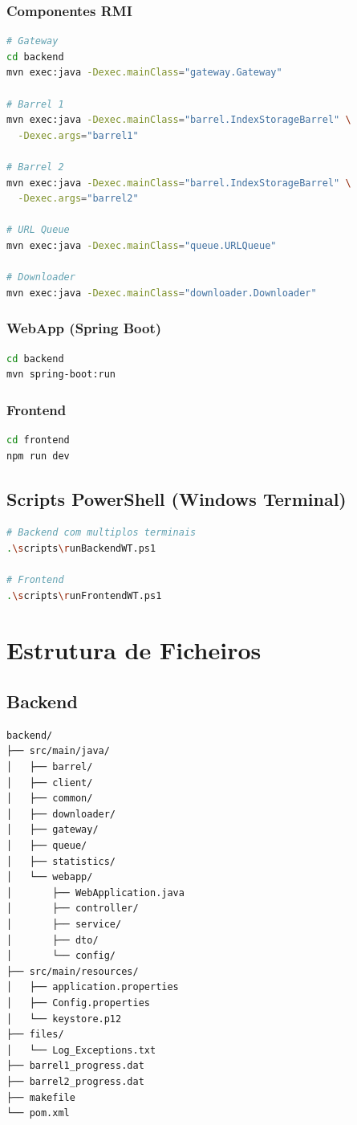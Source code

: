 \documentclass[12pt,a4paper]{article}
\begin{document}
\subsubsection{Componentes RMI}
\begin{lstlisting}[language=bash]
# Gateway
cd backend
mvn exec:java -Dexec.mainClass="gateway.Gateway"

# Barrel 1
mvn exec:java -Dexec.mainClass="barrel.IndexStorageBarrel" \
  -Dexec.args="barrel1"

# Barrel 2
mvn exec:java -Dexec.mainClass="barrel.IndexStorageBarrel" \
  -Dexec.args="barrel2"

# URL Queue
mvn exec:java -Dexec.mainClass="queue.URLQueue"

# Downloader
mvn exec:java -Dexec.mainClass="downloader.Downloader"
\end{lstlisting}

\subsubsection{WebApp (Spring Boot)}
\begin{lstlisting}[language=bash]
cd backend
mvn spring-boot:run
\end{lstlisting}

\subsubsection{Frontend}
\begin{lstlisting}[language=bash]
cd frontend
npm run dev
\end{lstlisting}

\subsection{Scripts PowerShell (Windows Terminal)}
\begin{lstlisting}[language=bash]
# Backend com multiplos terminais
.\scripts\runBackendWT.ps1

# Frontend
.\scripts\runFrontendWT.ps1
\end{lstlisting}

\section{Estrutura de Ficheiros}

\subsection{Backend}
\begin{lstlisting}
backend/
├── src/main/java/
│   ├── barrel/
│   ├── client/
│   ├── common/
│   ├── downloader/
│   ├── gateway/
│   ├── queue/
│   ├── statistics/
│   └── webapp/
│       ├── WebApplication.java
│       ├── controller/
│       ├── service/
│       ├── dto/
│       └── config/
├── src/main/resources/
│   ├── application.properties
│   ├── Config.properties
│   └── keystore.p12
├── files/
│   └── Log_Exceptions.txt
├── barrel1_progress.dat
├── barrel2_progress.dat
├── makefile
└── pom.xml
\end{lstlisting}
\end{document}
